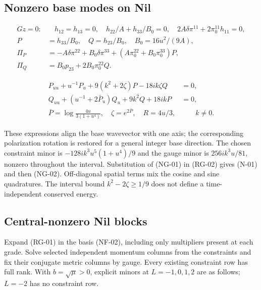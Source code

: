 \subsection{Nonzero base modes on Nil}

\begin{equation}\tag{NG-01}\label{eq:NG-01}
\begin{aligned}
Gz=0:&\quad h_{12}=h_{13}=0,\quad h_{22}/A+h_{33}/B_0=0,
\quad2A\delta\pi^{11}+2\pi^{11}_0h_{11}=0,\\
P&=h_{33}/B_0,\quad Q=h_{23}/B_0,\quad B_0=16u^2/(9A),\\
\Pi_P&=-A\delta\pi^{22}+B_0\delta\pi^{33}
+(A\pi^{22}_0+B_0\pi^{33}_0)P,\\
\Pi_Q&=B_0p_{23}+2B_0\pi^{22}_0Q.
\end{aligned}
\end{equation}

\begin{equation}\tag{NG-02}\label{eq:NG-02}
\begin{aligned}
P_{uu}+u^{-1}P_u+9(k^2+2\zeta)P-18ik\zeta Q&=0,\\
Q_{uu}+(u^{-1}+2\bar P_u)Q_u+9k^2Q+18ikP&=0,\\
\bar P=\log\frac{4u}{3(1+u^4)},\quad \zeta=e^{2\bar P},\quad R=4u/3,&\qquad k\ne0.
\end{aligned}
\end{equation}

These expressions align the base wavevector with one axis; the corresponding polarization rotation is restored for a general integer base direction. The chosen constraint minor is $-128ik^3u^5(1+u^4)/9$ and the gauge minor is $256ik^3u/81$, nonzero throughout the interval. Substitution of (NG-01) in (RG-02) gives (N-01) and then (NG-02). Off-diagonal spatial terms mix the cosine and sine quadratures. The interval bound $k^2-2\zeta\ge1/9$ does not define a time-independent conserved energy.

\subsection{Central-nonzero Nil blocks}

Expand (RG-01) in the basis (NF-02), including only multipliers present at each grade. Solve selected independent momentum columns from the constraints and fix their conjugate metric columns by gauge. Every existing constraint row has full rank. With $b=\sqrt\mu>0$, explicit minors at $L=-1,0,1,2$ are as follows; $L=-2$ has no constraint row.

